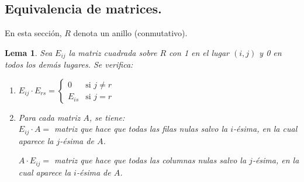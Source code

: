 \documentclass{article}
\theoremstyle{theorem-style}  %
\newtheorem{lemma}[theorem]{Lema}
\theoremstyle{definition}
\theoremstyle{example-style}
\begin{document}
	\subsection{Equivalencia de matrices.}
	En esta sección, $ R $ denota un anillo (conmutativo). 
	\begin{lemma}
		Sea $ E_{ij} $ la matriz cuadrada sobre $ R $ con 1 en el lugar $ (i,j) $ y 0 en todos los demás lugares. Se verifica:
		\begin{enumerate}[\hspace{1cm}i)]
			\item $E_{ij} \cdot E_{rs}= \begin{cases}
			0 &\text{si } j\neq r\\
			E_{is} &\text{si } j=r
			\end{cases}$
			\item Para cada matriz $A$, se tiene:\\
				$ E_{ij} \cdot A= $ matriz que hace que todas las filas nulas salvo la $ i $-ésima, en la cual aparece la $ j $-ésima de $ A $.
				
				$A \cdot E_{ij} = $ matriz que hace que todas las columnas nulas salvo la $ j $-ésima, en la cual aparece la $ i $-ésima de $ A $.
		\end{enumerate}
	\end{lemma}
\end{document}
